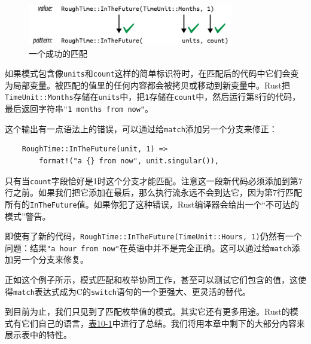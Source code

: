 \begin{figure}[htbp]
    \centering
    \includegraphics[width=0.8\textwidth]{../img/f10-5.png}
    \caption{一个成功的匹配}
    \label{f10-5}
\end{figure}

如果模式包含像\texttt{units}和\texttt{count}这样的简单标识符时，在匹配后的代码中它们会变为局部变量。被匹配的值里的任何内容都会被拷贝或移动到新变量中。Rust把\texttt{TimeUnit::Months}存储在\texttt{units}中，把\texttt{1}存储在\texttt{count}中，然后运行第8行的代码，最后返回字符串\texttt{"1 months from now"}。

这个输出有一点语法上的错误，可以通过给\texttt{match}添加另一个分支来修正：
\begin{verbatim}
    RoughTime::InTheFuture(unit, 1) =>
        format!("a {} from now", unit.singular()),
\end{verbatim}

只有当\texttt{count}字段恰好是1时这个分支才能匹配。注意这一段新代码必须添加到第7行之前。如果我们把它添加在最后，那么执行流永远不会到达它，因为第7行匹配所有的\texttt{InTheFuture}值。如果你犯了这种错误，Rust编译器会给出一个“不可达的模式”警告。

即使有了新的代码，\texttt{RoughTime::InTheFuture(TimeUnit::Hours, 1)}仍然有一个问题：结果\texttt{"a hour from now"}在英语中并不是完全正确。这可以通过给\texttt{match}添加另一个分支来修复。

正如这个例子所示，模式匹配和枚举协同工作，甚至可以测试它们包含的值，这使得\texttt{match}表达式成为C的\texttt{switch}语句的一个更强大、更灵活的替代。

到目前为止，我们只见到了匹配枚举值的模式。其实它还有更多用途。Rust的模式有它们自己的语言，\hyperref[t10-1]{表10-1}中进行了总结。我们将用本章中剩下的大部分内容来展示表中的特性。

